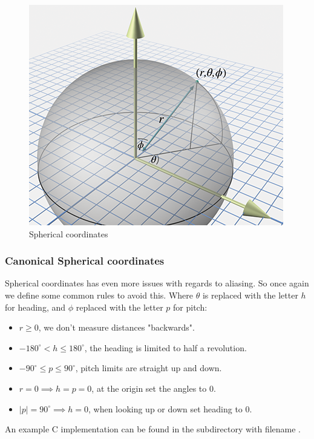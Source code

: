 \documentclass[a4paper,11pt]{article}
\begin{document}
\begin{figure}[H]
\centering
    \includegraphics{07_spherical_coordinates}
\caption{Spherical coordinates}
\label{fig:spherical-coordinates}
\end{figure}

\subsubsection{Canonical Spherical coordinates}

Spherical coordinates has even more issues with regards to aliasing. So once again we define some common rules to avoid this. Where $\theta$ is replaced with the letter $h$ for heading, and $\phi$ replaced with the letter $p$ for pitch:

\begin{itemize}
	\item $r \geq 0$, we don't measure distances "backwards".
	\item $-180^\circ < h \leq 180^\circ$, the heading is limited to half a revolution.
	\item  $-90^\circ \leq p \leq 90^\circ$, pitch limits are straight up and down.
	\item $r=0 \implies h=p=0$, at the origin set the angles to $0$.
	\item $|p|=90^\circ \implies h=0$, when looking up or down set heading to $0$.
\end{itemize}

An example C implementation can be found in the  subdirectory with filename .
\end{document}
